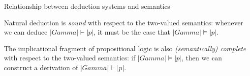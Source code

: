 \documentclass[t,compress,hyperref={hidelinks}]{beamer}
\begin{document}
\begin{frame}{Relationship between deduction systems and semantics}

Natural deduction is \emph{sound} with respect to the two-valued semantics: whenever we can deduce $|Gamma| \vdash |p|$, it must be the case that $|Gamma| \models |p|$.

The implicational fragment of propositional logic is also \emph{(semantically) complete} with respect to the two-valued semantics: if $|Gamma| \models |p|$, then we can construct a derivation of $|Gamma| \vdash |p|$.

\end{frame}
\end{document}
